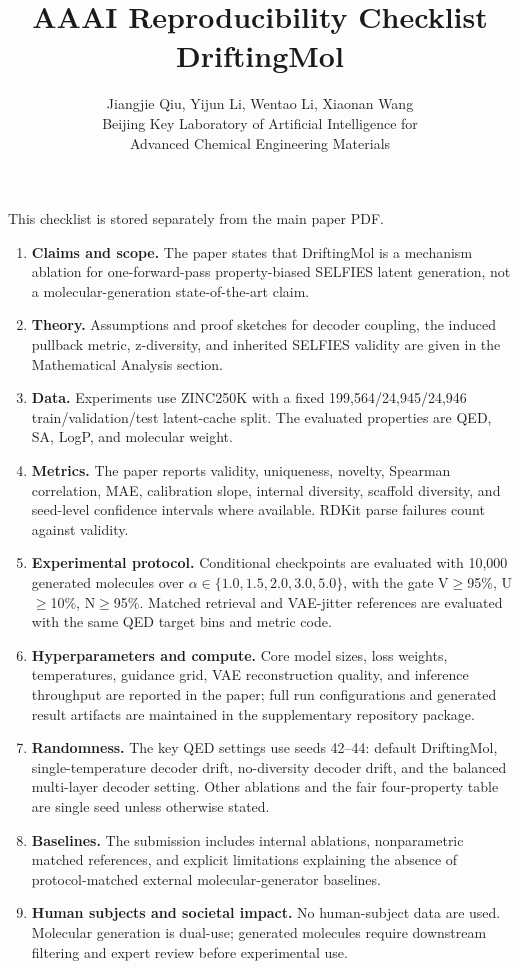 \documentclass[letterpaper]{article}
\title{AAAI Reproducibility Checklist\\DriftingMol}
\author{Jiangjie Qiu, Yijun Li, Wentao Li, Xiaonan Wang\\
Beijing Key Laboratory of Artificial Intelligence for\\
Advanced Chemical Engineering Materials}
\date{}
\begin{document}
\maketitle

This checklist is stored separately from the main paper PDF.

\begin{enumerate}
    \item \textbf{Claims and scope.} The paper states that DriftingMol is a
    mechanism ablation for one-forward-pass property-biased SELFIES latent
    generation, not a molecular-generation state-of-the-art claim.
    \item \textbf{Theory.} Assumptions and proof sketches for decoder coupling,
    the induced pullback metric, z-diversity, and inherited SELFIES validity are
    given in the Mathematical Analysis section.
    \item \textbf{Data.} Experiments use ZINC250K with a fixed
    199,564/24,945/24,946 train/validation/test latent-cache split. The
    evaluated properties are QED, SA, LogP, and molecular weight.
    \item \textbf{Metrics.} The paper reports validity, uniqueness, novelty,
    Spearman correlation, MAE, calibration slope, internal diversity, scaffold
    diversity, and seed-level confidence intervals where available. RDKit parse
    failures count against validity.
    \item \textbf{Experimental protocol.} Conditional checkpoints are evaluated
    with 10,000 generated molecules over
    $\alpha\in\{1.0,1.5,2.0,3.0,5.0\}$, with the gate V$\ge$95\%,
    U$\ge$10\%, N$\ge$95\%. Matched retrieval and VAE-jitter references are
    evaluated with the same QED target bins and metric code.
    \item \textbf{Hyperparameters and compute.} Core model sizes, loss weights,
    temperatures, guidance grid, VAE reconstruction quality, and inference
    throughput are reported in the paper; full run configurations and generated
    result artifacts are maintained in the supplementary repository package.
    \item \textbf{Randomness.} The key QED settings use seeds 42--44: default
    DriftingMol, single-temperature decoder drift, no-diversity decoder drift,
    and the balanced multi-layer decoder setting. Other ablations and the fair
    four-property table are single seed unless otherwise stated.
    \item \textbf{Baselines.} The submission includes internal ablations,
    nonparametric matched references, and explicit limitations explaining the
    absence of protocol-matched external molecular-generator baselines.
    \item \textbf{Human subjects and societal impact.} No human-subject data are
    used. Molecular generation is dual-use; generated molecules require
    downstream filtering and expert review before experimental use.
\end{enumerate}
\end{document}

